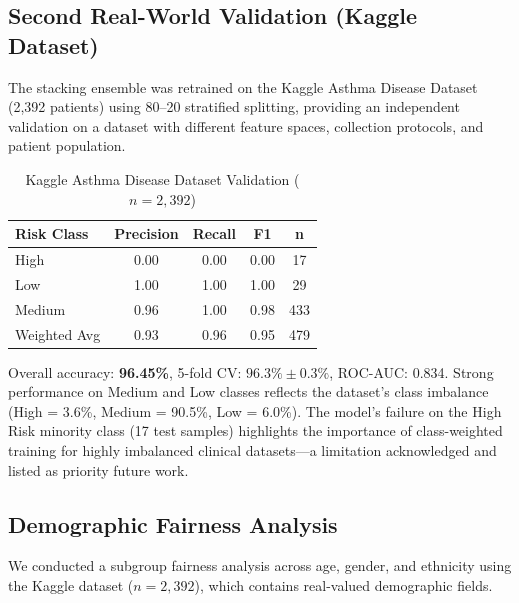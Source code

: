\documentclass[11pt,a4paper]{article}
\begin{document}
\subsection{Second Real-World Validation (Kaggle Dataset)}

The stacking ensemble was retrained on the Kaggle Asthma Disease Dataset (2,392
patients) using 80--20 stratified splitting, providing an independent validation
on a dataset with different feature spaces, collection protocols, and patient population.

\begin{table}[H]
\centering
\caption{Kaggle Asthma Disease Dataset Validation ($n = 2{,}392$)}
\label{tab:kaggle}
\begin{tabular}{lcccc}
\toprule
\textbf{Risk Class} & \textbf{Precision} & \textbf{Recall} & \textbf{F1} & \textbf{n} \\
\midrule
High   & 0.00 & 0.00 & 0.00 &  17 \\
Low    & 1.00 & 1.00 & 1.00 &  29 \\
Medium & 0.96 & 1.00 & 0.98 & 433 \\
\midrule
Weighted Avg & 0.93 & 0.96 & 0.95 & 479 \\
\bottomrule
\end{tabular}
\end{table}

\noindent Overall accuracy: \textbf{96.45\%}, 5-fold CV: $96.3\% \pm 0.3\%$, ROC-AUC: 0.834.
Strong performance on Medium and Low classes reflects the dataset's class imbalance
(High = 3.6\%, Medium = 90.5\%, Low = 6.0\%). The model's failure on the High Risk
minority class (17 test samples) highlights the importance of class-weighted training
for highly imbalanced clinical datasets---a limitation acknowledged and listed as
priority future work.

\subsection{Demographic Fairness Analysis}

We conducted a subgroup fairness analysis across age, gender, and ethnicity using
the Kaggle dataset ($n = 2{,}392$), which contains real-valued demographic fields.
\end{document}
